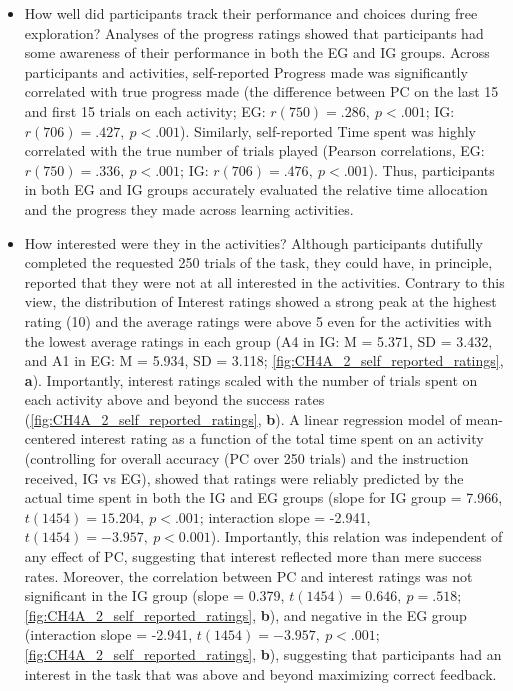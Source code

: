 \begin{subappendices}
\begin{itemize}
    \item How well did participants track their performance and choices during free exploration? Analyses of the progress ratings showed that participants had some awareness of their performance in both the \ac{EG} and \ac{IG} groups. Across participants and activities, self-reported Progress made was significantly correlated with true progress made (the difference between \ac{PC} on the last 15 and first 15 trials on each activity; \ac{EG}: $r(750)= .286, \ p < .001$; \ac{IG}: $r(706)= .427, \ p < .001$). Similarly, self-reported Time spent was highly correlated with the true number of trials played (Pearson correlations, \ac{EG}: $r(750)= .336,\ p < .001$; \ac{IG}: $r(706)= .476,\ p < .001$). Thus, participants in both \ac{EG} and \ac{IG} groups accurately evaluated the relative time allocation and the progress they made across learning activities.
    \item How interested were they in the activities? Although participants dutifully completed the requested 250 trials of the task, they could have, in principle, reported that they were not at all interested in the activities. Contrary to this view, the distribution of Interest ratings showed a strong peak at the highest rating (10) and the average ratings were above 5 even for the activities with the lowest average ratings in each group (A4 in \ac{IG}: M = 5.371, SD = 3.432, and A1 in \ac{EG}: M = 5.934, SD = 3.118; \cref{fig:CH4A_2_self_reported_ratings}, \textbf{a}). Importantly, interest ratings scaled with the number of trials spent on each activity above and beyond the success rates (\cref{fig:CH4A_2_self_reported_ratings}, \textbf{b}). A linear regression model of mean-centered interest rating as a function of the total time spent on an activity (controlling for overall accuracy (\ac{PC} over 250 trials) and the instruction received, \ac{IG} vs \ac{EG}), showed that ratings were reliably predicted by the actual time spent in both the \ac{IG} and \ac{EG} groups (slope for \ac{IG} group = 7.966, $t(1454) = 15.204,\ p < .001$; interaction slope = -2.941, $t(1454) = -3.957,\ p < 0.001$).  Importantly, this relation was independent of any effect of \ac{PC}, suggesting that interest reflected more than mere success rates. Moreover, the correlation between \ac{PC} and interest ratings was not significant in the \ac{IG} group (slope = 0.379, $t(1454) = 0.646,\ p = .518$; \cref{fig:CH4A_2_self_reported_ratings}, \textbf{b}), and negative in the \ac{EG} group (interaction slope = -2.941, $t(1454) = -3.957,\ p < .001$; \cref{fig:CH4A_2_self_reported_ratings}, \textbf{b}), suggesting that participants had an interest in the task that was above and beyond maximizing correct feedback.
\end{itemize}


\end{subappendices}
